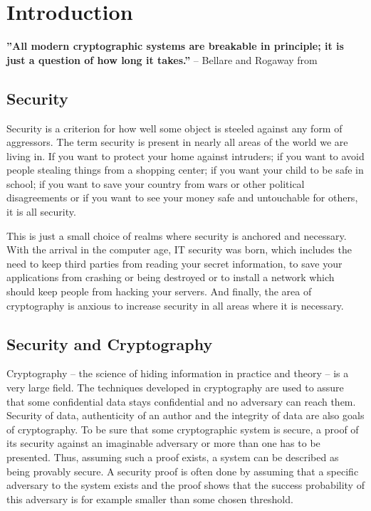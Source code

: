 \chapter{Introduction}
\label{introduction}
\begin{center}
\textbf{''All modern cryptographic systems are breakable in principle; it is just a question of how long it takes.''} -- Bellare and Rogaway from \cite{Bellare05}\newline
\end{center}

\section*{Security}
Security is a criterion for how well some object is steeled against any form of aggressors. The term security is present in nearly all areas of the world
we are living in. If you want to protect your home against intruders; if you want to avoid people stealing things from a shopping center; if you want
your child to be safe in school; if you want to save your country from wars or other political
disagreements or if you want to see your money safe and untouchable for others, it is all security.

This is just a small choice of realms where security is anchored and necessary. With the arrival in the computer age, IT security was born,
which includes the need to keep third parties from reading your secret information, to save your applications from crashing or being destroyed or to
install a network which should keep people from hacking your servers. And finally, the area of cryptography is anxious to increase security in
all areas where it is necessary.

\section*{Security and Cryptography}
Cryptography -- the science of hiding information in practice and theory -- is a very large field. The techniques developed in cryptography
are used to assure that some confidential data stays confidential and no adversary can reach them. Security of data, authenticity of an author
and the integrity of data are also goals of cryptography. To be sure that some cryptographic system is secure, a proof of its security against
an imaginable adversary or more than one has to be presented. Thus, assuming such a proof exists, a system can be described as being provably secure.
A security proof is often done by assuming that a specific adversary to the system exists and the proof shows that the success probability of
this adversary is for example smaller than some chosen threshold.

